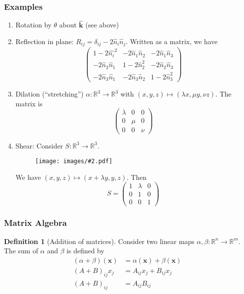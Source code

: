 \documentclass[a4paper]{article}
\theoremstyle{definition}
\newtheorem*{defi}{Definition}
\newcommand{\mb}[1]{\mathbf{#1}}
\newcommand{\R}{\mathbb{R}}
\newcommand{\img}[2][]{\begin{figure}[ht]\centering\texttt{[image: images/\#2.pdf]}\end{figure}}
\begin{document}
\subsubsection{Examples}
\begin{enumerate}
\item Rotation by $\theta$ about $\mb{\hat k}$ (see above)
\item Reflection in plane: $R_{ij} = \delta_{ij} - 2\hat n_i\hat n_j$. Written as a matrix, we have
  \[
  \begin{pmatrix}
    1 - 2\hat{n_i}^2 & -2\hat n_1\hat n_2 & -2\hat n_1\hat n_3\\
    -2\hat n_2\hat n_1 & 1 - 2\hat n_2^2 & -2\hat n_2\hat n_3\\
    -2\hat n_3\hat n_1 & -2\hat n_3\hat n_2 & 1 - 2\hat n_3^2
  \end{pmatrix}
  \]
\item Dilation (``stretching'') $\alpha: \R^3 \to \R^3$ with $(x, y, z)\mapsto (\lambda x, \mu y, \nu z)$. The matrix is
  \[
  \begin{pmatrix}
    \lambda & 0 & 0\\
    0 & \mu & 0\\
    0 & 0 & \nu
  \end{pmatrix}
  \]
\item Shear: Consider $S:\R^3 \to \R^3$.

\img{vm_5}

We have $(x, y, z)\mapsto (x + \lambda y, y, z)$. Then
\[
S =
\begin{pmatrix}
  1 & \lambda & 0\\
  0 & 1 & 0\\
  0 & 0 & 1
\end{pmatrix}
\]
\end{enumerate}

\subsubsection{Matrix Algebra}
\begin{defi}[Addition of matrices] Consider two linear maps $\alpha, \beta: \R^n\to \R^m$. The sum of $\alpha$ and $\beta$ is defined by
  \begin{align*}
    (\alpha + \beta)(\mb{x}) &= \alpha(\mb{x}) + \beta(\mb{x})\\
    (A + B)_{ij}x_j &= A_{ij}x_j + B_{ij}x_j\\
    (A + B)_{ij} &= A_{ij}B_{ij}
  \end{align*}
\end{defi}
\end{document}
